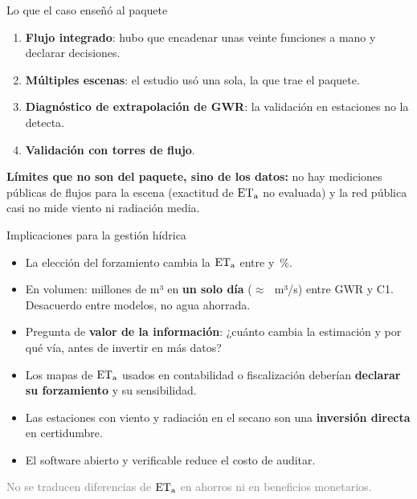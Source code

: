 \begin{frame}{Lo que el caso enseñó al paquete}
\begin{enumerate}
  \item \textbf{Flujo integrado}: hubo que encadenar unas veinte funciones a mano y declarar \NDecisions{} decisiones.
  \item \textbf{Múltiples escenas}: el estudio usó una sola, la que trae el paquete.
  \item \textbf{Diagnóstico de extrapolación de GWR}: la validación en estaciones no la detecta.
  \item \textbf{Validación con torres de flujo}.
\end{enumerate}
\vspace{3mm}
\textbf{Límites que no son del paquete, sino de los datos:} no hay mediciones públicas de flujos para la escena (exactitud de $\mathrm{ET_a}$ no evaluada) y la red pública casi no mide viento ni radiación media.
\end{frame}

\begin{frame}{Implicaciones para la gestión hídrica}
\begin{itemize}
  \item La elección del forzamiento cambia la $\mathrm{ET_a}$ entre \DEtaCThreeGWRPct{} y \DEtaCTwoIDWPct\,\%.
  \item En volumen: \VolDiffAbsCThreeGWR{} millones de m³ en \textbf{un solo día} ($\approx$\,\VolDiffFlowCThreeGWR~m³/s) entre GWR y C1. Desacuerdo entre modelos, no agua ahorrada.
  \item Pregunta de \textbf{valor de la información}: ¿cuánto cambia la estimación y por qué vía, antes de invertir en más datos?
  \item Los mapas de $\mathrm{ET_a}$ usados en contabilidad o fiscalización deberían \textbf{declarar su forzamiento} y su sensibilidad.
  \item Las estaciones con viento y radiación en el secano son una \textbf{inversión directa} en certidumbre.
  \item El software abierto y verificable reduce el costo de auditar.
\end{itemize}
\vspace{2mm}
\small\textcolor{gray}{No se traducen diferencias de $\mathrm{ET_a}$ en ahorros ni en beneficios monetarios.}
\end{frame}

